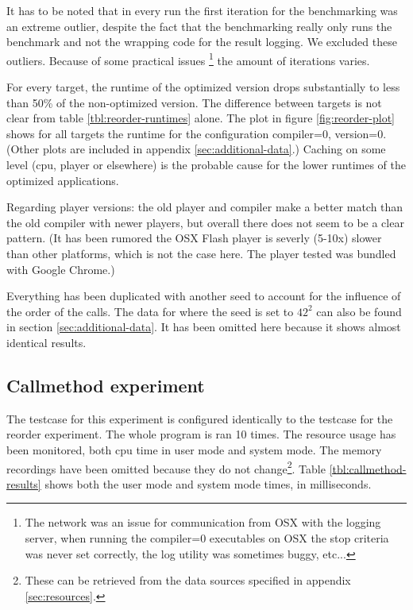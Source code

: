 \documentclass[a4paper,11pt]{scrartcl}
\begin{document}
It has to be noted that in every run the first iteration for the benchmarking was an extreme outlier, despite the fact that the benchmarking really only runs the benchmark and not the wrapping code for the result logging. We excluded these outliers. Because of some practical issues \footnote{The network was an issue for communication from OSX with the logging server, when running the compiler=0 executables on OSX the stop criteria was never set correctly, the log utility was sometimes buggy, etc...} the amount of iterations varies. 

For every target, the runtime of the optimized version drops substantially to less than 50\% of the non-optimized version. The difference between targets is not clear from table \ref{tbl:reorder-runtimes} alone. The plot in figure \ref{fig:reorder-plot} shows for all targets the runtime for the configuration compiler=0, version=0. (Other plots are included in appendix \ref{sec:additional-data}.) Caching on some level (cpu, player or elsewhere) is the probable cause for the lower runtimes of the optimized applications.

Regarding player versions: the old player and compiler make a better match than the old compiler with newer players, but overall there does not seem to be a clear pattern. (It has been rumored the OSX Flash player is severly (5-10x) slower than other platforms, which is not the case here. The player tested was bundled with Google Chrome.) 

Everything has been duplicated with another seed to account for the influence of the order of the calls. The data for where the seed is set to $42^2$ can also be found in section \ref{sec:additional-data}. It has been omitted here because it shows almost identical results.


\subsection{Callmethod experiment}
\label{sec:results-callmethod}

The testcase for this experiment is configured identically to the testcase for the reorder experiment. The whole program is ran 10 times. The resource usage has been monitored, both cpu time in user mode and system mode. The memory recordings have been omitted because they do not change\footnote{These can be retrieved from the data sources specified in appendix \ref{sec:resources}.}. Table \ref{tbl:callmethod-results} shows both the user mode and system mode times, in milliseconds.
\end{document}
